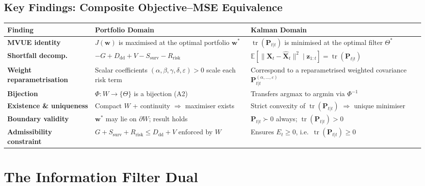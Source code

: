 \documentclass[12pt,openany]{book}
\numberwithin{equation}{chapter}
\theoremstyle{plain}
\theoremstyle{definition}
\theoremstyle{remark}
\DeclareMathOperator{\tr}{tr}
\def\mathcal#1{#1}%
\begin{document}
\subsection*{Key Findings: Composite Objective--MSE Equivalence}
\label{subsec:objective-key-findings}

\begin{center}
\begin{tabularx}{\linewidth}{@{}>{\small\bfseries\RaggedRight}p{4.0cm}
                              >{\raggedright\arraybackslash}X
                              >{\raggedright\arraybackslash}X@{}}
\toprule
\textbf{Finding} & \textbf{Portfolio Domain} &
\textbf{Kalman Domain} \\
\midrule
MVUE identity &
$J(\mathbf{w})$ is maximised at the
optimal portfolio $\mathbf{w}^*$ &
$\tr(\mathbf{P}_{t|t})$ is minimised
at the optimal filter $\Theta^*$ \\[6pt]
Shortfall decomp. &
$-G+D_{\mathrm{dd}}+V
 -S_{\mathrm{surv}}-R_{\mathrm{risk}}$ &
$\mathbb{E}[\|\mathbf{X}_t
 -\hat{\mathbf{X}}_t\|^2
 \mid\mathbf{z}_{1:t}]
 =\tr(\mathbf{P}_{t|t})$ \\[6pt]
Weight reparametrisation &
Scalar coefficients
$(\alpha,\beta,\gamma,\delta,\varepsilon)>0$
scale each risk term &
Correspond to a reparametrised
weighted covariance
$\mathbf{P}_{t|t}^{(\alpha,\dots,\varepsilon)}$ \\[6pt]
Bijection &
$\Phi:\mathcal{W}\to\{\Theta\}$
is a bijection (A2) &
Transfers argmax to argmin
via $\Phi^{-1}$ \\[6pt]
Existence \& uniqueness &
Compact $\mathcal{W}$ + continuity
$\Rightarrow$ maximiser exists &
Strict convexity of
$\tr(\mathbf{P}_{t|t})$
$\Rightarrow$ unique minimiser \\[6pt]
Boundary validity &
$\mathbf{w}^*$ may lie on
$\partial\mathcal{W}$; result holds &
$\mathbf{P}_{t|t}\succ 0$ always;
$\tr(\mathbf{P}_{t|t})>0$ \\[6pt]
Admissibility constraint &
$G+S_{\mathrm{surv}}+R_{\mathrm{risk}}
 \le D_{\mathrm{dd}}+V$
enforced by $\mathcal{W}$ &
Ensures $\mathcal{E}_t\ge 0$,
i.e.\ $\tr(\mathbf{P}_{t|t})\ge 0$ \\
\bottomrule
\end{tabularx}
\end{center}

\section{The Information Filter Dual}
\end{document}
